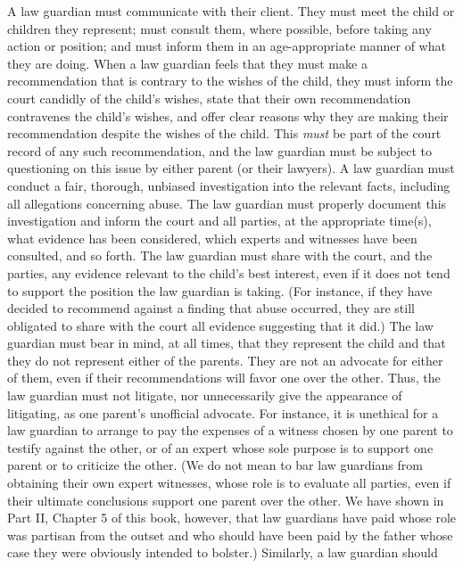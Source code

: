 \documentclass[11pt, twoside]{article}
\begin{document}
{{\begin{docEnumerate}
\enumsItem{}  A law guardian must communicate with their client. They must
meet the child or children they represent; must consult them,
where possible, before taking any action or position; and must
inform them in an age-appropriate manner of what they are
doing.
\enumsItem{}  When a law guardian feels that they must make a
recommendation that is contrary to the wishes of the child,
they must inform the court candidly of the child’s wishes, state
that their own recommendation contravenes the child’s wishes,
and offer clear reasons why they are making their
recommendation despite the wishes of the child. This \textit{must} be
part of the court record of any such recommendation, and the
law guardian must be subject to questioning on this issue by
either parent (or their lawyers).
\enumsItem{} A law guardian must conduct a fair, thorough, unbiased
investigation into the relevant facts, including all allegations
concerning abuse. The law guardian must properly document
this investigation and inform the court and all parties, at the
appropriate time(s), what evidence has been considered, which
experts and witnesses have been consulted, and so forth.
\enumsItem{} The law guardian must share with the court, and the parties,
any evidence relevant to the child’s best interest, even if it does
not tend to support the position the law guardian is taking.
(For instance, if they have decided to recommend against a
finding that abuse occurred, they are still obligated to share
with the court all evidence suggesting that it did.)
\enumsItem{}  The law guardian must bear in mind, at all times, that they
represent the child and that they do not represent either of the
parents. They are not an advocate for either of them, even if
their recommendations will favor one over the other. Thus, the
law guardian must not litigate, nor unnecessarily give the
appearance of litigating, as one parent’s unofficial advocate. For
instance, it is unethical for a law guardian to arrange to pay the
expenses of a witness chosen by one parent to testify against the
other, or of an expert whose sole purpose is to support one
parent or to criticize the other. (We do not mean to bar law
guardians from obtaining their own expert witnesses, whose
role is to evaluate all parties, even if their ultimate conclusions
support one parent over the other. We have shown in Part II,
Chapter 5 of this book, however, that law guardians have paid
 whose role was partisan from the outset and who
should have been paid by the father whose case they were
obviously intended to bolster.) Similarly, a law guardian should

\end{docEnumerate}}}
\end{document}
